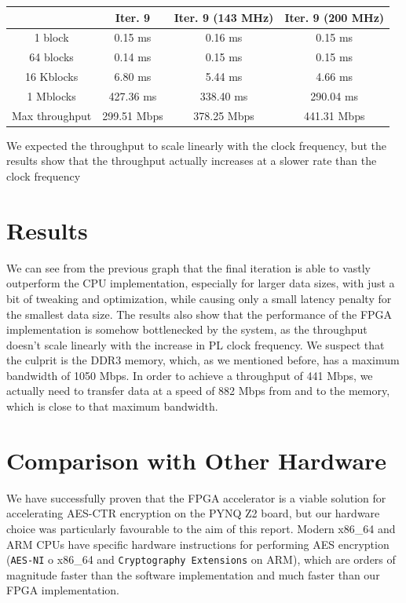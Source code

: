 \documentclass[12pt,oneside,a4paper]{article}
\begin{document}
\begin{table}[h!]
	\centering
	\begin{tabular}{cccc}
		\toprule
		 & Iter. 9 & Iter. 9 (143 MHz) & Iter. 9 (200 MHz) \\
		\midrule
		1 block & 0.15 ms & 0.16 ms & 0.15 ms \\
		64 blocks & 0.14 ms & 0.15 ms & 0.15 ms \\
		16 Kblocks & 6.80 ms & 5.44 ms & 4.66 ms \\
		1 Mblocks & 427.36 ms & 338.40 ms & 290.04 ms \\
		Max throughput & 299.51 Mbps & 378.25 Mbps & 441.31 Mbps \\
		\bottomrule
	\end{tabular}
\end{table}

We expected the throughput to scale linearly with the clock frequency, but the results show that the throughput actually increases at a slower rate than the clock frequency

\section{Results} \label{sec:results}
We can see from the previous graph that the final iteration is able to vastly outperform the CPU implementation, especially for larger data sizes, with just a bit of tweaking and optimization, while causing only a small latency penalty for the smallest data size.
The results also show that the performance of the FPGA implementation is somehow bottlenecked by the system, as the throughput doesn't scale linearly with the increase in PL clock frequency.
We suspect that the culprit is the DDR3 memory, which, as we mentioned before, has a maximum bandwidth of 1050 Mbps. In order to achieve a throughput of 441 Mbps, we actually need to transfer data at a speed of 882 Mbps from and to the memory, which is close to that maximum bandwidth.

\section{Comparison with Other Hardware} \label{sec:conclusions}
We have successfully proven that the FPGA accelerator is a viable solution for accelerating AES-CTR encryption on the PYNQ Z2 board, but our hardware choice was particularly favourable to the aim of this report.
Modern x86\_64 and ARM CPUs have specific hardware instructions for performing AES encryption (\texttt{AES-NI} \cite{aes:aes-ni} o x86\_64 and \texttt{Cryptography Extensions} \cite{aes:arm-extensions} on ARM), which are orders of magnitude faster than the software implementation and much faster than our FPGA implementation.
\end{document}
